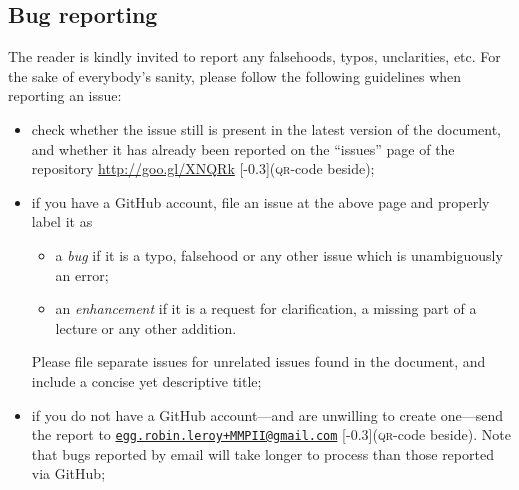 \documentclass[10pt, a4paper, twoside]{lecturenotes}
\begin{document}
\subsection*{Bug reporting}
The reader is kindly invited to report any falsehoods, typos, unclarities, etc. For the sake of everybody's sanity, please follow the following guidelines when reporting an issue:
\begin{itemize}
\item check whether the issue still is present in the latest version of the document, and whether it has already been reported on the ``issues'' page of the repository \url{http://goo.gl/XNQRk} [-0.3\marginparwidth](\textsc{qr}-code beside);%
\item if you have a GitHub account, file an issue at the above page and properly label it as
\begin{itemize}
\item a \emph{bug} if it is a typo, falsehood or any other issue which is unambiguously an error;
\item an \emph{enhancement} if it is a request for clarification, a missing part of a lecture or any other addition.
\end{itemize}
Please file separate issues for unrelated issues found in the document, and include a concise yet descriptive title;
\item if you do not have a GitHub account---and are unwilling to create one---send the report to \hyperref{mailto:egg.robin.leroy+MMPII@gmail.com}{}{}{\nolinkurl{egg.robin.leroy+MMPII@gmail.com}} [-0.3\marginparwidth](\textsc{qr}-code beside). Note that bugs reported by email will take longer to process than those reported via GitHub;

\end{itemize}
\end{document}
